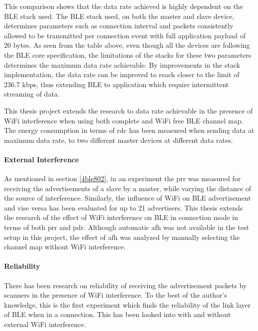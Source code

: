 This comparison shows that the data rate achieved is highly dependent on the BLE stack used. The BLE stack used, on both the master and slave device, determines parameters such as connection interval and packets consistently allowed to be transmitted per connection event with full application payload of 20 bytes. As seen from the table above, even though all the devices are following the BLE core specification, the limitations of the stacks for these two parameters determines the maximum data rate achievable. By improvements in the stack implementation, the data rate can be improved to reach closer to the limit of 236.7 kbps, thus extending BLE to application which require intermittent streaming of data.

This thesis project extends the research to data rate achievable in the presence of WiFi interference when using both complete and WiFi free BLE channel map. The energy consumption in terms of \gls{rdc} has been measured when sending data at maximum data rate, to two different master devices at different data rates.

\paragraph{External Interference}
As mentioned in section \ref{4ble802}, in an experiment\cite{Siekkinen2012} the \gls{prr} was measured for receiving the advertisements of a slave by a master, while varying the distance of the source of interference. Similarly, the influence of WiFi on BLE advertisement and vise versa has been evaluated for up to 21 advertisers\cite{Wyffels}. This thesis extends the research of the effect of WiFi interference on BLE in connection mode in terms of both \gls{prr} and \gls{pdr}. Although automatic \gls{afh} was not available in the test setup in this project, the effect of \gls{afh} was analyzed by manually selecting the channel map without WiFi interference. 

\paragraph{Reliability} There has been research on reliability of receiving the advertisement packets by scanners in the presence of WiFi interference\cite{Wyffels}\cite{Siekkinen2012}. To the best of the author's knowledge, this is the first experiment which finds the reliability of the link layer of BLE when in a connection. This has been looked into with and without external WiFi interference.

